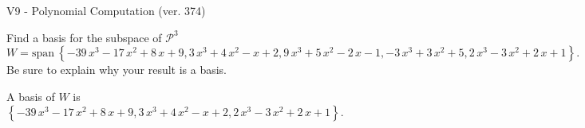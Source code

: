 \begin{exercise}
  \begin{exerciseTitle}V9 - Polynomial Computation (ver. 374)\end{exerciseTitle}
  \begin{exerciseStatement}
    Find a basis for the subspace of \(\mathcal{P}^3\) 
\[W=\mathrm{span}\ \left\{-39 \, x^{3} - 17 \, x^{2} + 8 \, x + 9 , 3 \, x^{3} + 4 \, x^{2} - x + 2 , 9 \, x^{3} + 5 \, x^{2} - 2 \, x - 1 , -3 \, x^{3} + 3 \, x^{2} + 5 , 2 \, x^{3} - 3 \, x^{2} + 2 \, x + 1\right\}.\]
 Be sure to explain why your result is a basis.


  \end{exerciseStatement}
  \begin{exerciseAnswer}
   A basis of \(W\) is  \(\left\{-39 \, x^{3} - 17 \, x^{2} + 8 \, x + 9 , 3 \, x^{3} + 4 \, x^{2} - x + 2 , 2 \, x^{3} - 3 \, x^{2} + 2 \, x + 1\right\}\).
  


  \end{exerciseAnswer}
\end{exercise}